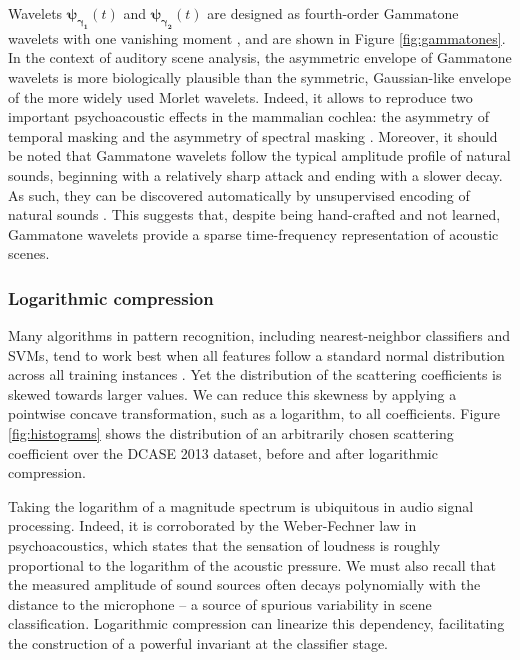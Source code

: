 Wavelets $\boldsymbol{\psi_{\gamma_1}}(t)$ and $\boldsymbol{\psi_{\gamma_2}}(t)$ are designed as fourth-order Gammatone
wavelets with one vanishing moment \cite{Venkitaraman2014}, and are shown in Figure \ref{fig:gammatones}.
In the context of auditory scene analysis, the asymmetric envelope of Gammatone wavelets is more biologically plausible than the symmetric, Gaussian-like envelope of the more widely used Morlet wavelets.
Indeed, it allows to reproduce two important psychoacoustic effects in the mammalian cochlea: the asymmetry of temporal masking and the asymmetry of spectral masking  \cite{Fastl2007}.
Moreover, it should be noted that Gammatone wavelets follow the typical amplitude profile of natural sounds, beginning with a relatively sharp attack and ending with a slower decay.
As such, they can be discovered automatically by unsupervised encoding of natural sounds \cite{Smith2006}.
This suggests that, despite being hand-crafted and not learned, Gammatone wavelets provide a sparse time-frequency representation of acoustic scenes.

\subsubsection{Logarithmic compression}
\label{sec:logcomp}

Many algorithms in pattern recognition, including nearest-neighbor classifiers and SVMs, tend to work best when all features follow a standard normal distribution across all training instances \cite{Hsu2003}.
Yet the distribution of the scattering coefficients is skewed towards larger values. We can reduce this skewness by applying a pointwise concave transformation, such as a logarithm, to all coefficients.
Figure \ref{fig:histograms} shows the distribution of an arbitrarily chosen scattering coefficient over the DCASE 2013 dataset, before and after logarithmic compression.



Taking the logarithm of a magnitude spectrum is ubiquitous in audio signal processing.
Indeed, it is corroborated by the Weber-Fechner law in psychoacoustics, which states that the sensation of loudness is roughly proportional to the logarithm of the acoustic pressure. 
We must also recall that the measured amplitude of sound sources often decays polynomially with the distance to the microphone -- a source of spurious variability in scene classification.
Logarithmic compression can linearize this dependency, facilitating the construction of a powerful invariant at the classifier stage.

